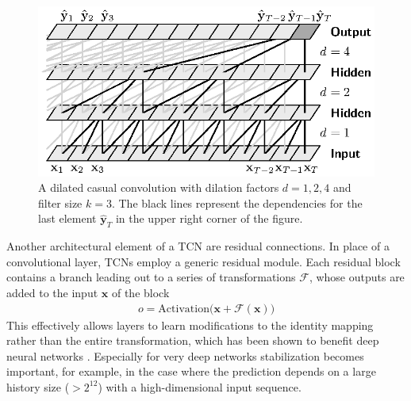 \documentclass{scrartcl}
\begin{document}
\begin{figure}[htbp]
\centering
\includegraphics[scale=1]{figures/dilated_conv.eps}
\caption{A dilated casual convolution with dilation factors $d = 1,2,4$ and filter size $k=3$. The black lines represent the dependencies for the last element $\hat{\mathbf y}_T$ in the upper right corner of the figure.}
\label{fig:dilated_convolutions} 
\end{figure}

Another architectural element of a TCN are residual connections. In place of a convolutional layer, TCNs employ a generic residual module. Each residual block contains a branch leading out to a series of transformations $\mathcal F$, whose outputs are added to the input $\mathbf x$ of the block 
\begin{align}
o = \text{Activation} \big(\mathbf x + \mathcal F(\mathbf x)\big)
\end{align}
This effectively allows layers to learn modifications to the identity mapping rather than the entire transformation, which has been shown to benefit deep neural networks \cite{He2016}. Especially for very deep networks stabilization becomes important, for example, in the case where the prediction depends on a large history size ($> 2^{12}$) with a high-dimensional input sequence. 
\end{document}
